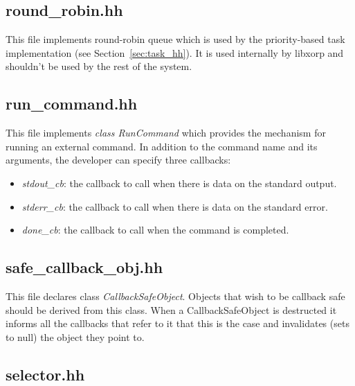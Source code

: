 \documentclass[11pt]{article}
\begin{document}
\subsection{round\_robin.hh}

This file implements round-robin queue which is used by the
priority-based task implementation (see Section~\ref{sec:task_hh}).
It is used internally by libxorp and shouldn't be used by the rest of
the system.

\subsection{run\_command.hh}

This file implements \emph{class RunCommand} which provides the
mechanism for running an external command. In addition to the command
name and its arguments, the developer can specify three callbacks:

\begin{itemize}

  \item \emph{stdout\_cb}: the callback to call when there is data on
  the standard output.

  \item \emph{stderr\_cb}: the callback to call when there is data on
  the standard error.

  \item \emph{done\_cb}: the callback to call when the command is completed.

\end{itemize}

\subsection{safe\_callback\_obj.hh}

This file declares class \emph{CallbackSafeObject}.
Objects that wish to be callback safe should be derived from this
class. When a CallbackSafeObject is destructed it informs all the callbacks
that refer to it that this is the case and invalidates (sets to null)
the object they point to.

\subsection{selector.hh}
\end{document}
